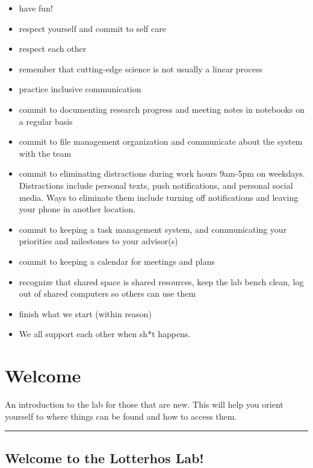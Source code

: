 \documentclass[
  letterpaper,
  DIV=11,
  numbers=noendperiod]{scrreprt}
\begin{document}

\begin{itemize}
\item
  have fun!
\item
  respect yourself and commit to self care
\item
  respect each other
\item
  remember that cutting-edge science is not usually a linear process
\item
  practice inclusive communication
\item
  commit to documenting research progress and meeting notes in notebooks
  on a regular basis
\item
  commit to file management organization and communicate about the
  system with the team
\item
  commit to eliminating distractions during work hours 9am-5pm on
  weekdays. Distractions include personal texts, push notifications, and
  personal social media. Ways to eliminate them include turning off
  notifications and leaving your phone in another location.
\item
  commit to keeping a task management system, and communicating your
  priorities and milestones to your advisor(s)
\item
  commit to keeping a calendar for meetings and plans
\item
  recognize that shared space is shared resources, keep the lab bench
  clean, log out of shared computers so others can use them
\item
  finish what we start (within reason)
\item
  We all support each other when sh*t happens.
\end{itemize}

\hypertarget{welcome}{%
\chapter{Welcome}\label{welcome}}

An introduction to the lab for those that are new. This will help you
orient yourself to where things can be found and how to access them.

\begin{center}\rule{0.5\linewidth}{0.5pt}\end{center}

\hypertarget{welcome-to-the-lotterhos-lab}{%
\section*{\texorpdfstring{\textbf{Welcome to the Lotterhos
Lab!}}{Welcome to the Lotterhos Lab!}}\label{welcome-to-the-lotterhos-lab}}
\end{document}
